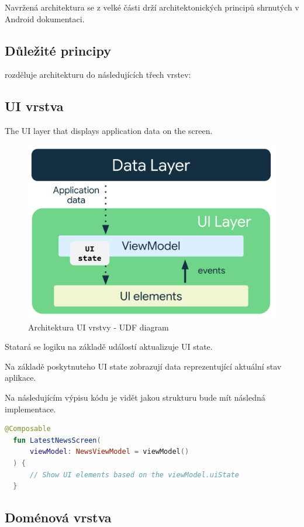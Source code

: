 Navržená architektura se z velké části drží architektonických principů shrnutých v Android dokumentaci. \cite{andDocArch}

\subsection*{Důležité principy}





rozděluje architekturu do následujících třech vrstev:

\subsection*{UI vrstva}
The UI layer that displays application data on the screen.

\begin{figure}[H]
  \centering
  \includegraphics[width=.5\textwidth]{arch-ui-udf.png}
  \caption{Architektura UI vrstvy - UDF diagram}
  \label{fig:arch_ui_udf}
\end{figure}

Statará se logiku
na základě událostí aktualizuje UI state.

Na základě poskytnuteho UI state zobrazují data reprezentující aktuální stav aplikace.

Na následujícím výpisu kódu je vidět jakou strukturu bude mít následná implementace.

\begin{lstlisting}[caption={Popis UI widgetů pomocí jazyka Kotlin}, label={lst:ConsumeUIState}, language=Kotlin]
  @Composable
  fun LatestNewsScreen(
      viewModel: NewsViewModel = viewModel()
  ) {
      // Show UI elements based on the viewModel.uiState
  }
\end{lstlisting}

\subsection*{Doménová vrstva}

